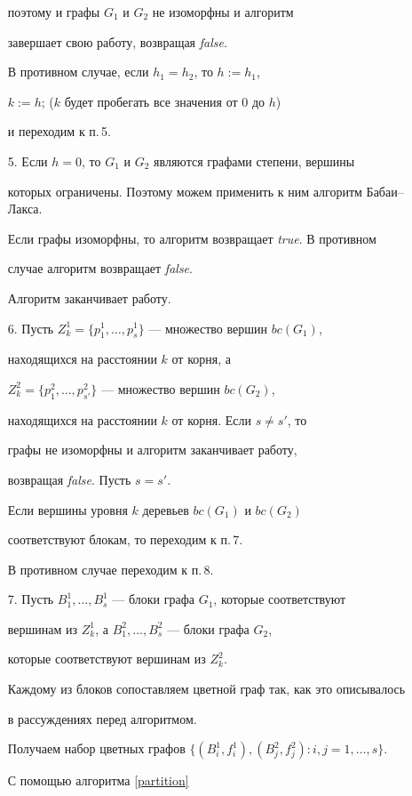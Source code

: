 \begin{algs}
\begin{itemize}
поэтому и графы $G_1$ и $G_2$ не изоморфны и алгоритм


завершает свою работу, возвращая {\it false}.


В противном случае, если $h_1=h_2$, то $h:=h_1$,


$k:=h$; ($k$ будет пробегать все значения от $0$ до $h$)


и переходим к п.\,5.


\item[5.] Если $h=0$, то $G_1$ и $G_2$ являются графами степени, вершины


которых ограничены. Поэтому можем применить к ним алгоритм Бабаи--Лакса.


Если графы изоморфны, то алгоритм возвращает {\it true}. В противном


случае алгоритм возвращает {\it false}.


Алгоритм заканчивает работу.


\item[6.]  Пусть $Z_k^{1}=\{p_1^1, \dotsc, p_s^1\}$ --- множество вершин $bc(G_1)$,


находящихся на расстоянии $k$ от корня, а


$Z_k^{2}=\{p_1^2, \dotsc, p_{s'}^2\}$ --- множество вершин $bc(G_2)$,


находящихся на расстоянии $k$ от корня. Если $s\ne s'$, то


графы не изоморфны и алгоритм заканчивает работу,


возвращая {\it false}. Пусть $s=s'$.


Если вершины уровня $k$ деревьев $bc(G_1)$ и $bc(G_2)$


соответствуют блокам, то переходим к п.\,7.


В противном случае переходим к п.\,8.


\item[7.] Пусть $B_1^1,\dotsc, B_s^1$ --- блоки графа $G_1$, которые соответствуют


вершинам из $Z_k^1$, а $B_1^2,\dotsc, B_s^2$ --- блоки графа $G_2$,


которые соответствуют вершинам из $Z_k^2$.


Каждому из блоков сопоставляем цветной граф так, как это описывалось


в рассуждениях перед алгоритмом.


Получаем набор цветных графов $\{(B_i^1, f_i^1),


(B_j^2, f_j^2): i, j=1,\dotsc, s\}$.


С помощью алгоритма \ref{partition}



\end{itemize}
\end{algs}
